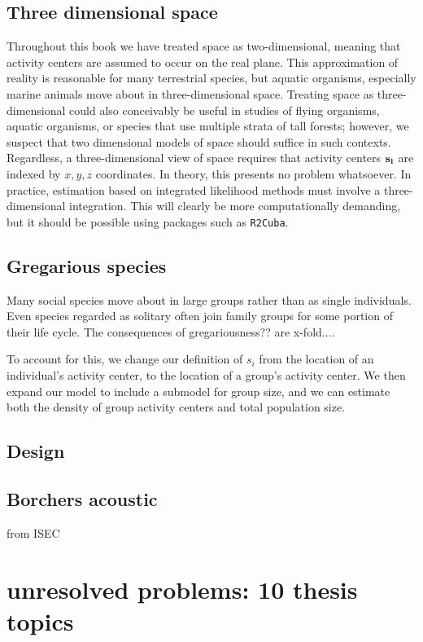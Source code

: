 \subsection{Three dimensional space}

Throughout this book we have treated space as
two-dimensional, meaning that activity centers are assumed to occur on
the real plane. This approximation of reality is reasonable for many
terrestrial species, but aquatic organisms, especially marine animals
move about in three-dimensional space. Treating space as
three-dimensional could also conceivably be useful in studies of
flying organisms, aquatic organisms, 
or species that use multiple strata of tall forests; however, we
suspect that two dimensional models of space should suffice in such
contexts. Regardless, a three-dimensional view of space requires that
activity centers $\bf s_i$ are indexed by
$x,y,z$ coordinates. In theory, this presents no problem whatsoever. In
practice, estimation based on integrated likelihood methods must
involve a three-dimensional integration. This will clearly be more
computationally demanding, but it should be possible using packages
such as {\tt R2Cuba}.


\subsection{Gregarious species}

Many social species move about in large groups rather than as single
individuals. Even species regarded as solitary often join family
groups for some portion of their life cycle. The consequences of
gregariousness?? are x-fold....

To account for this, we change our definition of $s_i$ from the
location of an individual's activity center, to the location of a
group's activity center. We then expand our model to include a
submodel for group size, and we can estimate both the density of group
activity centers and total population size.

\subsection{Design}


\subsection{Borchers acoustic}

from ISEC


\section{unresolved problems: 10 thesis topics}


